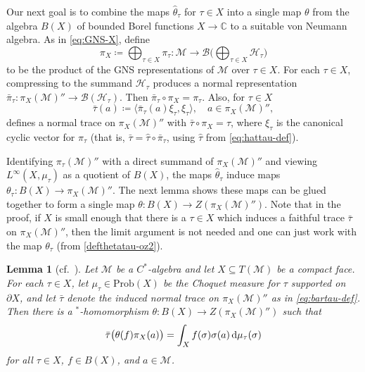 \documentclass[a4paper,11pt]{amsart}
\newtheorem{lemma}[theorem]{Lemma}
\theoremstyle{definition}
\numberwithin{equation}{section}
\numberwithin{theorem}{section}
\newcommand{\M}{\mathcal{M}}
\begin{document}
Our next goal is to combine the maps $\hat\theta_\tau$ for $\tau \in X$ into a single map $\theta$ from the algebra $B(X)$ of bounded Borel functions $X \rightarrow \mathbb C$ to a suitable von Neumann algebra.  As in \eqref{eq:GNS-X}, define
\begin{equation}
    \pi_X \coloneqq \bigoplus_{\tau \in X} \pi_\tau \colon \mathcal M \rightarrow \mathcal B\Big(\bigoplus_{\tau \in X} \mathcal H_\tau \Big)
\end{equation}
to be the product of the GNS representations of $\mathcal M$ over $\tau \in X$.  For each $\tau \in X$, compressing to the summand $\mathcal H_\tau$ produces a normal representation $\bar \pi_\tau \colon \pi_X(\mathcal M)'' \rightarrow \mathcal B(\mathcal H_\tau)$.  Then $\bar\pi_\tau \circ \pi_X = \pi_\tau$.  Also, for $\tau \in X$
\begin{equation}\label{eq:bartau-def}
    \bar\tau(a) \coloneqq \langle \bar\pi_\tau(a) \xi_\tau, \xi_\tau \rangle, \quad a \in \pi_X(\mathcal M)'',
\end{equation}
defines a normal trace on $\pi_X(\mathcal M)''$ with $\bar \tau \circ \pi_X = \tau$, where $\xi_\tau$ is the canonical cyclic vector for $\pi_\tau$ (that is, $\bar\tau = \hat\tau\circ\bar\pi_\tau$, using $\hat\tau$ from \eqref{eq:hattau-def}).

Identifying $\pi_\tau(\mathcal M)''$ with a direct summand of $\pi_X(\mathcal M)''$ and viewing $L^\infty(X, \mu_\tau)$ as a quotient of $B(X)$, the maps $\hat\theta_\tau$ induce maps $\theta_\tau \colon B(X) \rightarrow \pi_X(\mathcal M)''$.  The next lemma shows these maps can be glued together to form a single map $\theta \colon B(X) \rightarrow Z(\pi_X(\mathcal M)'')$. Note that in the proof, if $X$ is small enough that there is a $\tau\in X$ which induces a faithful trace $\bar{\tau}$ on $\pi_X(\M)''$, then the limit argument is not needed and one can just work with the map $\theta_\tau$ (from \eqref{defthetatau-oz2}).

\begin{lemma}[{cf.\ \cite[Theorem~3]{Oz13}}]\label{lem:oz-global}
    Let $\mathcal M$ be a $C^*$-algebra and let $X \subseteq T(\mathcal M)$ be a compact face. For each $\tau \in X$,  let $\mu_\tau \in \mathrm{Prob}(X)$ be the Choquet measure for $\tau$ supported on $\partial X$, and let $\bar \tau$ denote the induced normal trace on $\pi_X(\mathcal M)''$ as in \eqref{eq:bartau-def}. Then there is a $^*$-homomorphism $\theta \colon B(X) \rightarrow Z(\pi_X(\mathcal M)'')$ such that
    \begin{equation}\label{oz-2}
        \bar\tau\big(\theta(f)\pi_X(a)\big) = \int_X f(\sigma) \sigma(a) \,{\rm d}\mu_\tau(\sigma)
    \end{equation}
    for all $\tau \in X$, $f \in B(X)$, and $a \in \mathcal M$.
\end{lemma}
\end{document}
